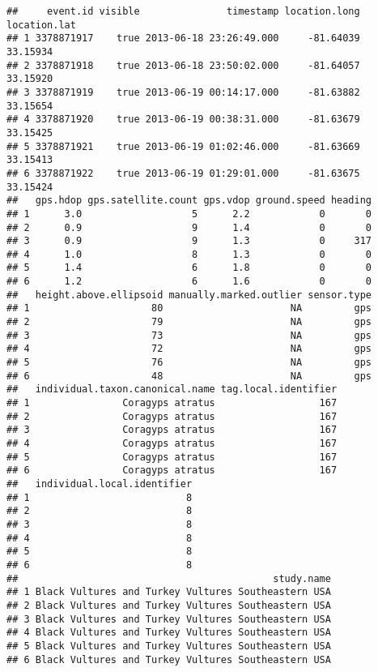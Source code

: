 \documentclass[
]{article}
\begin{document}
\begin{verbatim}
##     event.id visible               timestamp location.long location.lat
## 1 3378871917    true 2013-06-18 23:26:49.000     -81.64039     33.15934
## 2 3378871918    true 2013-06-18 23:50:02.000     -81.64057     33.15920
## 3 3378871919    true 2013-06-19 00:14:17.000     -81.63882     33.15654
## 4 3378871920    true 2013-06-19 00:38:31.000     -81.63679     33.15425
## 5 3378871921    true 2013-06-19 01:02:46.000     -81.63669     33.15413
## 6 3378871922    true 2013-06-19 01:29:01.000     -81.63675     33.15424
##   gps.hdop gps.satellite.count gps.vdop ground.speed heading
## 1      3.0                   5      2.2            0       0
## 2      0.9                   9      1.4            0       0
## 3      0.9                   9      1.3            0     317
## 4      1.0                   8      1.3            0       0
## 5      1.4                   6      1.8            0       0
## 6      1.2                   6      1.6            0       0
##   height.above.ellipsoid manually.marked.outlier sensor.type
## 1                     80                      NA         gps
## 2                     79                      NA         gps
## 3                     73                      NA         gps
## 4                     72                      NA         gps
## 5                     76                      NA         gps
## 6                     48                      NA         gps
##   individual.taxon.canonical.name tag.local.identifier
## 1                Coragyps atratus                  167
## 2                Coragyps atratus                  167
## 3                Coragyps atratus                  167
## 4                Coragyps atratus                  167
## 5                Coragyps atratus                  167
## 6                Coragyps atratus                  167
##   individual.local.identifier
## 1                           8
## 2                           8
## 3                           8
## 4                           8
## 5                           8
## 6                           8
##                                            study.name
## 1 Black Vultures and Turkey Vultures Southeastern USA
## 2 Black Vultures and Turkey Vultures Southeastern USA
## 3 Black Vultures and Turkey Vultures Southeastern USA
## 4 Black Vultures and Turkey Vultures Southeastern USA
## 5 Black Vultures and Turkey Vultures Southeastern USA
## 6 Black Vultures and Turkey Vultures Southeastern USA
\end{verbatim}
\end{document}

